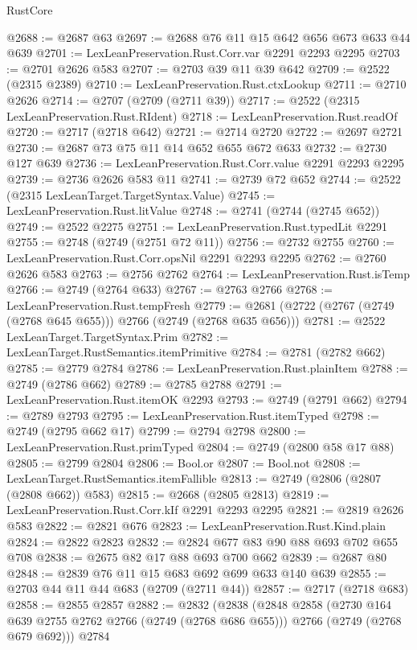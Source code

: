 \begin{lexlean}{RustCore}
\begin{coremodule}
@2688 := @2687 @63
@2697 := @2688 @76 @11 @15 @642 @656 @673 @633 @44 @639
@2701 := LexLeanPreservation.Rust.Corr.var @2291 @2293 @2295
@2703 := @2701 @2626 @583
@2707 := @2703 @39 @11 @39 @642
@2709 := @2522 (@2315 @2389)
@2710 := LexLeanPreservation.Rust.ctxLookup
@2711 := @2710 @2626
@2714 := @2707 (@2709 (@2711 @39))
@2717 := @2522 (@2315 LexLeanPreservation.Rust.RIdent)
@2718 := LexLeanPreservation.Rust.readOf
@2720 := @2717 (@2718 @642)
@2721 := @2714 @2720
@2722 := @2697 @2721
@2730 := @2687 @73 @75 @11 @14 @652 @655 @672 @633
@2732 := @2730 @127 @639
@2736 := LexLeanPreservation.Rust.Corr.value @2291 @2293 @2295
@2739 := @2736 @2626 @583 @11
@2741 := @2739 @72 @652
@2744 := @2522 (@2315 LexLeanTarget.TargetSyntax.Value)
@2745 := LexLeanPreservation.Rust.litValue
@2748 := @2741 (@2744 (@2745 @652))
@2749 := @2522 @2275
@2751 := LexLeanPreservation.Rust.typedLit @2291
@2755 := @2748 (@2749 (@2751 @72 @11))
@2756 := @2732 @2755
@2760 := LexLeanPreservation.Rust.Corr.opsNil @2291 @2293 @2295
@2762 := @2760 @2626 @583
@2763 := @2756 @2762
@2764 := LexLeanPreservation.Rust.isTemp
@2766 := @2749 (@2764 @633)
@2767 := @2763 @2766
@2768 := LexLeanPreservation.Rust.tempFresh
@2779 := @2681 (@2722 (@2767 (@2749 (@2768 @645 @655))) @2766 (@2749 (@2768 @635 @656)))
@2781 := @2522 LexLeanTarget.TargetSyntax.Prim
@2782 := LexLeanTarget.RustSemantics.itemPrimitive
@2784 := @2781 (@2782 @662)
@2785 := @2779 @2784
@2786 := LexLeanPreservation.Rust.plainItem
@2788 := @2749 (@2786 @662)
@2789 := @2785 @2788
@2791 := LexLeanPreservation.Rust.itemOK @2293
@2793 := @2749 (@2791 @662)
@2794 := @2789 @2793
@2795 := LexLeanPreservation.Rust.itemTyped
@2798 := @2749 (@2795 @662 @17)
@2799 := @2794 @2798
@2800 := LexLeanPreservation.Rust.primTyped
@2804 := @2749 (@2800 @58 @17 @88)
@2805 := @2799 @2804
@2806 := Bool.or
@2807 := Bool.not
@2808 := LexLeanTarget.RustSemantics.itemFallible
@2813 := @2749 (@2806 (@2807 (@2808 @662)) @583)
@2815 := @2668 (@2805 @2813)
@2819 := LexLeanPreservation.Rust.Corr.kIf @2291 @2293 @2295
@2821 := @2819 @2626 @583
@2822 := @2821 @676
@2823 := LexLeanPreservation.Rust.Kind.plain
@2824 := @2822 @2823
@2832 := @2824 @677 @83 @90 @88 @693 @702 @655 @708
@2838 := @2675 @82 @17 @88 @693 @700 @662
@2839 := @2687 @80
@2848 := @2839 @76 @11 @15 @683 @692 @699 @633 @140 @639
@2855 := @2703 @44 @11 @44 @683 (@2709 (@2711 @44))
@2857 := @2717 (@2718 @683)
@2858 := @2855 @2857
@2882 := @2832
    (@2838
      (@2848
        @2858
        (@2730 @164 @639 @2755 @2762 @2766 (@2749 (@2768 @686 @655)))
        @2766
        (@2749 (@2768 @679 @692)))
      @2784

\end{coremodule}
\end{lexlean}
